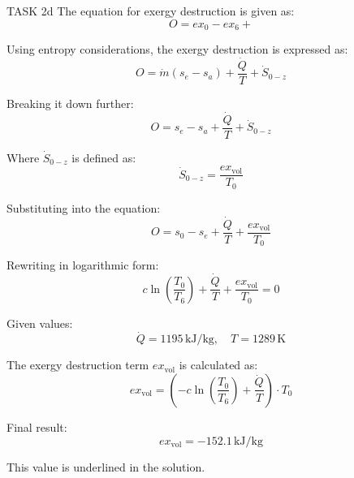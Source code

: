 TASK 2d  
The equation for exergy destruction is given as:  
\[
O = ex_{0} - ex_{6} + 
\]  

Using entropy considerations, the exergy destruction is expressed as:  
\[
O = \dot{m} (s_e - s_a) + \frac{\dot{Q}}{T} + \dot{S}_{0-z}
\]  

Breaking it down further:  
\[
O = s_e - s_a + \frac{\dot{Q}}{T} + \dot{S}_{0-z}
\]  

Where \( \dot{S}_{0-z} \) is defined as:  
\[
\dot{S}_{0-z} = \frac{ex_{\text{vol}}}{T_0}
\]  

Substituting into the equation:  
\[
O = s_0 - s_e + \frac{\dot{Q}}{T} + \frac{ex_{\text{vol}}}{T_0}
\]  

Rewriting in logarithmic form:  
\[
c \ln \left( \frac{T_0}{T_6} \right) + \frac{\dot{Q}}{T} + \frac{ex_{\text{vol}}}{T_0} = 0
\]  

Given values:  
\[
\dot{Q} = 1195 \, \text{kJ/kg}, \quad T = 1289 \, \text{K}
\]  

The exergy destruction term \( ex_{\text{vol}} \) is calculated as:  
\[
ex_{\text{vol}} = \left( -c \ln \left( \frac{T_0}{T_6} \right) + \frac{\dot{Q}}{T} \right) \cdot T_0
\]  

Final result:  
\[
ex_{\text{vol}} = -152.1 \, \text{kJ/kg}
\]  

This value is underlined in the solution.